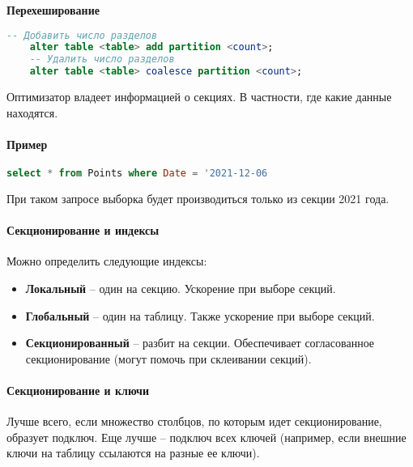 \textbf{Перехеширование}

\begin{lstlisting}[language=SQL]
    -- Добавить число разделов
    alter table <table> add partition <count>;
    -- Удалить число разделов
    alter table <table> coalesce partition <count>;
\end{lstlisting}

\begin{proposition}
	Оптимизатор владеет информацией о секциях. В частности, где какие данные находятся.
\end{proposition}

\paragraph{Пример}

\begin{lstlisting}[language=SQL]
    select * from Points where Date = '2021-12-06
\end{lstlisting}

При таком запросе выборка будет производиться только из секции 2021 года.

\paragraph{Секционирование и индексы}

Можно определить следующие индексы:

\begin{itemize}
	\item \textbf{Локальный} -- один на секцию. Ускорение при выборе секций.
	\item \textbf{Глобальный} -- один на таблицу. Также ускорение при выборе секций.
	\item \textbf{Секционированный} -- разбит на секции. Обеспечивает согласованное
	      секционирование (могут помочь при склеивании секций).
\end{itemize}

\paragraph{Секционирование и ключи}

Лучше всего, если множество столбцов, по которым идет секционирование, образует подключ. Еще лучше
-- подключ всех ключей (например, если внешние ключи на таблицу ссылаются на разные ее ключи).
